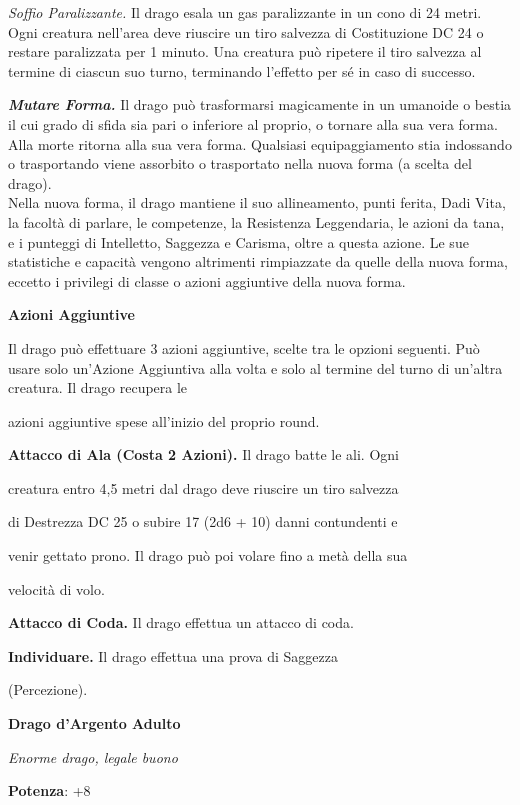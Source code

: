 \begin{multicols}{2}
\emph{Soffio Paralizzante.} Il drago esala un gas paralizzante in un
cono di 24 metri. Ogni creatura nell'area deve riuscire un tiro salvezza
di Costituzione DC 24 o restare paralizzata per 1 minuto. Una creatura
può ripetere il tiro salvezza al termine di ciascun suo turno,
terminando l'effetto per sé in caso di successo.

\emph{\textbf{Mutare Forma.}} Il drago può trasformarsi magicamente in
un umanoide o bestia il cui grado di sfida sia pari o inferiore al proprio,  o tornare alla sua vera forma. Alla morte ritorna alla sua vera forma.  Qualsiasi equipaggiamento stia indossando o trasportando viene  assorbito o trasportato nella nuova forma (a scelta del drago).  \\
Nella nuova forma, il drago mantiene il suo allineamento, punti  ferita, Dadi Vita, la facoltà di parlare, le competenze, la Resistenza  Leggendaria, le azioni da tana, e i punteggi di Intelletto, Saggezza  e Carisma, oltre a questa azione. Le sue statistiche e capacità  vengono altrimenti rimpiazzate da quelle della nuova forma, eccetto i privilegi di classe o azioni aggiuntive della nuova forma.

\textbf{Azioni Aggiuntive}

Il drago può effettuare 3 azioni aggiuntive, scelte tra le opzioni  seguenti. Può usare solo un'Azione Aggiuntiva alla volta e solo  al termine del turno di un'altra creatura. Il drago recupera le

azioni aggiuntive spese all'inizio del proprio round.

\textbf{Attacco di Ala (Costa 2 Azioni).} Il drago batte le ali. Ogni

creatura entro 4,5 metri dal drago deve riuscire un tiro salvezza

di Destrezza DC 25 o subire 17 (2d6 + 10) danni contundenti e

venir gettato prono. Il drago può poi volare fino a metà della sua

velocità di volo.

\textbf{Attacco di Coda.} Il drago effettua un attacco di coda.

\textbf{Individuare.} Il drago effettua una prova di Saggezza

(Percezione).



\textbf{Drago d'Argento Adulto}

\emph{Enorme drago, legale buono}

\textbf{Potenza}: +8


\end{multicols}
